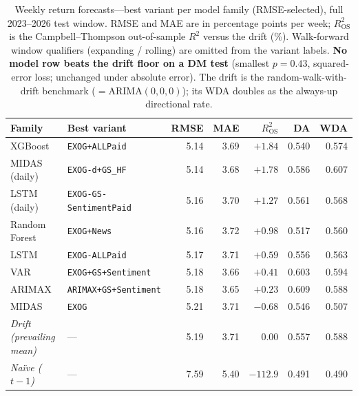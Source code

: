 \documentclass[12pt, a4paper]{article}
\begin{document}
\begin{table}[htbp]
    \centering
    \footnotesize
    \setlength{\tabcolsep}{5pt}
    \caption{Weekly return forecasts---best variant per model family (RMSE-selected), full
    2023--2026 test window. RMSE and MAE are in percentage points per week; \(R^2_{\text{OS}}\)
    is the Campbell--Thompson out-of-sample \(R^2\) versus the drift (\%). Walk-forward window
    qualifiers (expanding / rolling) are omitted from the variant labels. \textbf{No model row
    beats the drift floor on a DM test} (smallest \(p=0.43\), squared-error loss; unchanged
    under absolute error). The drift is the random-walk-with-drift benchmark
    (\(=\mathrm{ARIMA}(0,0,0)\)); its WDA doubles as the always-up directional rate.}
    \label{tab:returns-leaderboard}
    \begin{tabular}{l l r r r r r}
        \toprule
        Family & Best variant & RMSE & MAE & \(R^2_{\text{OS}}\) & DA & WDA \\
        \midrule
        XGBoost        & \texttt{EXOG+ALLPaid}             & 5.14 & 3.69 & $+1.84$ & 0.540 & 0.574 \\
        MIDAS (daily)  & \texttt{EXOG-d+GS\_HF}            & 5.14 & 3.68 & $+1.78$ & 0.586 & 0.607 \\
        LSTM (daily)   & \texttt{EXOG-GS-SentimentPaid}    & 5.16 & 3.70 & $+1.27$ & 0.561 & 0.568 \\
        Random Forest  & \texttt{EXOG+News}                & 5.16 & 3.72 & $+0.98$ & 0.517 & 0.560 \\
        LSTM           & \texttt{EXOG-ALLPaid}             & 5.17 & 3.71 & $+0.59$ & 0.556 & 0.563 \\
        VAR            & \texttt{EXOG+GS+Sentiment}        & 5.18 & 3.66 & $+0.41$ & 0.603 & 0.594 \\
        ARIMAX         & \texttt{ARIMAX+GS+Sentiment}      & 5.18 & 3.65 & $+0.23$ & 0.609 & 0.588 \\
        MIDAS          & \texttt{EXOG}                     & 5.21 & 3.71 & $-0.68$ & 0.546 & 0.507 \\
        \midrule
        \textit{Drift (prevailing mean)} & --- & 5.19 & 3.71 & $0.00$   & 0.557 & 0.588 \\
        \textit{Naïve (\(t{-}1\))}       & --- & 7.59 & 5.40 & $-112.9$ & 0.491 & 0.490 \\
        \bottomrule
    \end{tabular}
\end{table}
\end{document}
